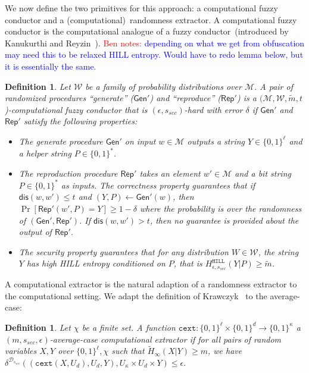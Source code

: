\documentclass[11pt]{article}
\newcommand{\class}[1]{{\ensuremath{\mathsf{#1}}}}
\newcommand{\gen}{\ensuremath{\class{Gen}}\xspace}
\newcommand{\rep}{\ensuremath{\class{Rep}}\xspace}
\newcommand{\zo}{\ensuremath{\{0, 1\}}}
\newcommand{\dis}{\ensuremath{\mathsf{dis}}}
\newcommand{\hill}{\ensuremath{\mathtt{HILL}}\xspace}
\newcommand{\cext}{\ensuremath{\mathtt{cext}}}
\newtheorem{definition}[theorem]{Definition}
\newcommand{\authnote}[2]{{\textcolor{red}{\textsf{#1 notes: }\textcolor{blue}{ #2}}\marginpar{\textcolor{red}{\textbf{!!!!!}}}}}
\newcommand{\authnote}[2]{}
\newcommand{\bnote}[1]{{\authnote{Ben}{#1}}}
\begin{document}
We now define the two primitives for this approach: a computational fuzzy conductor and a (computational)~randomness extractor.  A computational fuzzy conductor is the computational analogue of a fuzzy conductor~(introduced by Kanukurthi and Reyzin~\cite{KanukurthiR09}).
\bnote{depending on what we get from obfuscation may need this to be relaxed HILL entropy.  Would have to redo lemma below, but it is essentially the same.}
\begin{definition}
\label{def:comp fuzzy cond}
Let $\mathcal{W}$ be a family of probability distributions over $\mathcal{M}$.  A pair of randomized procedures ``generate'' ($\gen'$) and ``reproduce'' ($\rep'$) is a $(\mathcal{M}, \mathcal{W}, \tilde{m}, t$)-computational fuzzy conductor that is $(\epsilon, s_{sec})$-hard with error $\delta$ if $\gen'$ and $\rep'$ satisfy the following properties:
\begin{itemize}
\item The generate procedure $\gen'$ on input $w\in \mathcal{M}$ outputs a string $Y\in\{0,1\}^\ell$ and a helper string $P\in\{0,1\}^*$.
\item The reproduction procedure $\rep'$ takes an element $w'\in\mathcal{M}$ and a bit string $P\in\{0,1\}^*$ as inputs.  The \emph{correctness} property guarantees that if $\dis(w, w')\leq t$ and $(Y, P)\leftarrow \gen'(w)$, then $\Pr[\rep'( w', P) = Y] \geq 1-\delta$ where the probability is over the randomness of $(\gen', \rep')$.  
If $\dis(w, w') > t$, then no guarantee is provided about the output of $\rep'$.
\item The \emph{security} property guarantees that for any distribution $W\in \mathcal{W}$, the string $Y$ has high HILL entropy conditioned on $P$, that is $H^{\hill}_{\epsilon, s_{sec}}(Y |P)\geq \tilde{m}$.
\end{itemize}
\end{definition}

A computational extractor is the natural adaption of a randomness extractor to the computational setting.  We adapt the definition of Krawczyk~\cite{krawczyk2010cryptographic} to the average-case:
\begin{definition}
Let $\chi$ be a finite set.
A function $\cext: \zo^\ell \times \{0,1\}^d \rightarrow \{0,1\}^\kappa$ a \emph{$(m, s_{sec}, \epsilon)$-average-case computational extractor} if for all pairs
of random variables $X, Y$ over $\zo^\ell, \chi$ such that
$\tilde{H}_\infty(X|Y) \ge m$, we have $\delta^{\mathcal{D}_{s_{sec}}}((\cext(X, U_d), U_d, Y), U_\kappa\times
U_d \times Y) \le \epsilon$.
\end{definition}
\end{document}

